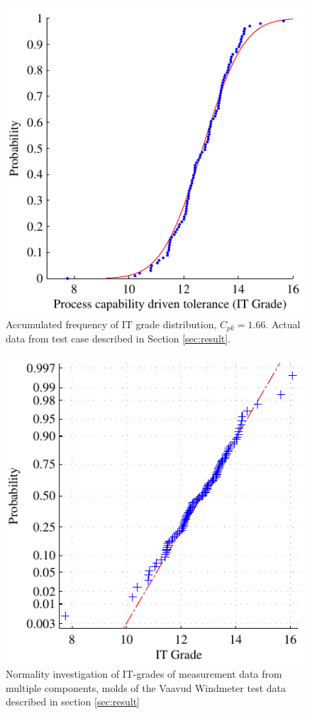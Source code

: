 \documentclass[aip,amsmath, reprint, author-year]{revtex4-1}
\begin{document}
\begin{figure}
\includegraphics{ITG_total.pdf}
\caption{\label{fig:acumfreq} Accumulated frequency of IT grade distribution, $C_{pk} =1.66$. 
Actual data from test case described in Section \ref{sec:result}. }
\end{figure}

\begin{figure}
\includegraphics{Normal_plot.pdf}
\caption{\label{fig:normplot} Normality investigation of IT-grades of measurement data from multiple components, molds of the Vaavud Windmeter test data described in section \ref{sec:result}}
\end{figure}
\end{document}
